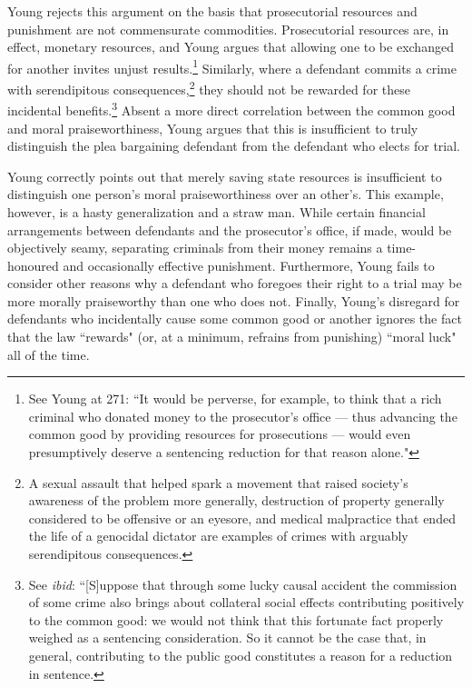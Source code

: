 Young rejects this argument on the basis that prosecutorial resources and punishment are not commensurate commodities. Prosecutorial resources are, in effect, monetary resources, and Young argues that allowing one to be exchanged for another invites unjust results.\footnote{See Young at 271: ``It would be perverse, for example, to think that a rich criminal who donated money to the prosecutor's office — thus advancing the common good by providing resources for prosecutions — would even presumptively deserve a sentencing reduction for that reason alone."} Similarly, where a defendant commits a crime with serendipitous consequences,\footnote{A sexual assault that helped spark a movement that raised society's awareness of the problem more generally, destruction of property generally considered to be offensive or an eyesore, and medical malpractice that ended the life of a genocidal dictator are examples of crimes with arguably serendipitous consequences.} they should not be rewarded for these incidental benefits.\footnote{See \textit{ibid}: ``[S]uppose that through some lucky causal accident the commission of some crime also brings about collateral social effects contributing positively to the common good: we would not think that this fortunate fact properly weighed as a sentencing consideration. So it cannot be the case that, in general, contributing to the public good constitutes a reason for a reduction in sentence.} Absent a more direct correlation between the common good and moral praiseworthiness, Young argues that this is insufficient to truly distinguish the plea bargaining defendant from the defendant who elects for trial.

Young correctly points out that merely saving state resources is insufficient to distinguish one person's moral praiseworthiness over an other's. This example, however, is a hasty generalization and a straw man. While certain financial arrangements between defendants and the prosecutor's office, if made, would be objectively seamy, separating criminals from their money remains a time-honoured and occasionally effective punishment. Furthermore, Young fails to consider other reasons why a defendant who foregoes their right to a trial may be more morally praiseworthy than one who does not. Finally, Young's disregard for defendants who incidentally cause some common good or another ignores the fact that the law ``rewards" (or, at a minimum, refrains from punishing) ``moral luck" all of the time.

